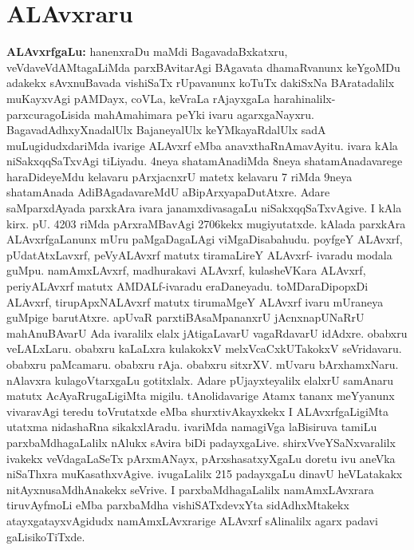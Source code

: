 \makeatletter
\def\@makechapterhead#1{%
  \vspace*{30\p@}%
\vspace*{25\p@}%
  {\parindent \z@ \centering \normalfont
    \ifnum \c@secnumdepth >\m@ne
      \if@mainmatter
        {\huge\bfseries  #1}\par\nobreak
	\vskip 4pt
      \fi
    \fi
\smallskip 

 \vskip 10\p@  
{\fontsize{12pt}{12pt}\selectfont\raggedleft{anu: \bf pu.ti.na.}\par}
  }
\vskip 40\p@}
\makeatother

\chapter{ALAvxraru}\label{chap008}

{\textbf{ALAvxrfgaLu:}} hanenxraDu maMdi BagavadaBxkatxru, veVdaveVdAMtagaLiMda parxBAvitarAgi BAgavata dhamaRvanunx keYgoMDu adakekx sAvxnuBavada vishiSaTx rUpavanunx koTuTx dakiSxNa BArata\-dalilx  muKayxvAgi pAMDayx, coVLa, keVraLa rAjayxgaLa harahinalilx-parxcuragoLisida mahAmahimara peYki ivaru agarxgaNayxru. BagavadAdhxyXnadalUlx BajaneyalUlx keYMkayaR\-dalUlx sadA muLugidudxdariMda ivarige ALAvxrf eMba anavxthaRnAmavAyitu. ivara kAla niSakxqqSaTxvAgi tiLiyadu. 4neya shatamAnadiMda 8neya shatamAnadavarege haraDideyeMdu kelavaru pArxjacnxrU matetx kelavaru 7 riMda 9neya shatamAnada AdiBAgadavareMdU aBipArxyapaDutAtxre. Adare saMparxdAyada parxkAra ivara janamxdivasagaLu niSakxqqSaTxvAgive. I kAla kirx. pU. 4203 riMda pArxraMBavAgi 2706kekx mugiyutatxde. kAlada parxkAra ALAvxrfgaLanunx mUru paMgaDagaLAgi viMgaDisabahudu. poyfgeY ALAvxrf, pUdatAtxLavxrf, peVyALAvxrf matutx tiramaLireY ALAvxrf- ivaradu modala guMpu. namAmxLAvxrf, madhurakavi ALAvxrf, kulasheVKara ALAvxrf, periyALAvxrf matutx AMDALf-ivaradu eraDaneyadu. toMDaraDipopxDi ALAvxrf, tirupApxNALAvxrf matutx tirumaMgeY ALAvxrf ivaru mUraneya guMpige barutAtxre. apUvaR parxtiBAsaMpananxrU jAcnxnapUNaRrU mahAnuBAvarU Ada ivaralilx elalx jAtigaLavarU vagaRdavarU idAdxre. obabxru veLALxLaru. obabxru kaLaLxra kulakokxV melxVcaCxkUTakokxV seVridavaru. obabxru paMcamaru. obabxru rAja. obabxru sitxrXV. mUvaru bArxhamxNaru. nAlavxra kulagoVtarxgaLu gotitxlalx. Adare pUjayxteyalilx elalxrU samAnaru matutx AcAyaRrugaLigiMta migilu. tAnolidavarige Atamx tananx meYyanunx vivaravAgi teredu toVrutatxde eMba shurxtivAkayxkekx I ALAvxrfgaLigiMta utatxma nidashaRna sikakxlAradu. ivariMda namagiVga laBisiruva tamiLu parxbaMdhagaLalilx nAlukx sAvira biDi padayxgaLive. shirxVveYSaNxvaralilx ivakekx veVdagaLaSeTx pArxmANayx, pArxshasatxyXgaLu doretu ivu aneVka niSaThxra muKasathxvAgive. ivugaLalilx 215 padayxgaLu dinavU heVLatakakx nitAyxnusaMdhAnakekx seVrive. I parxbaMdhagaLalilx namAmxLAvxrara tiruvAyfmoLi eMba parxbaMdha vishiSATxdevxYta sidAdhxMtakekx atayxgatayxvAgidudx namAmxLAvxrarige ALAvxrf sAlinalilx agarx padavi gaLisikoTiTxde.

